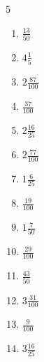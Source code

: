 \documentclass[12pt]{article}
\begin{document}
\begin{multicols}{5}
\begin{enumerate}
\item $ \frac{13}{50} $
\item $ 4 \frac{1}{5} $
\item $ 2 \frac{87}{100} $
\item $ \frac{37}{100} $
\item $ 2 \frac{16}{25} $
\item $ 2 \frac{77}{100} $
\item $ 1 \frac{6}{25} $
\item $ \frac{19}{100} $
\item $ 1 \frac{7}{50} $
\item $ \frac{29}{100} $
\item $ \frac{43}{50} $
\item $ 3 \frac{31}{100} $
\item $ \frac{9}{100} $
\item $ 3 \frac{16}{25} $
\end{enumerate}\end{multicols}\newpage
\end{document}
